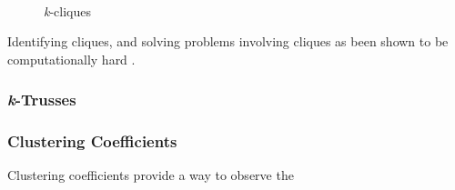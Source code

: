 \begin{figure}
  \centering
   ~  ~ 
  \caption{\emph{k}-cliques}
  \label{fig:cliques}
\end{figure}

Identifying cliques, and solving problems involving cliques as been shown to be computationally hard \cite{bomze99}.

\subsubsection{\emph{k}-Trusses}

\subsubsection{Clustering Coefficients}
Clustering coefficients provide a way to observe the 
